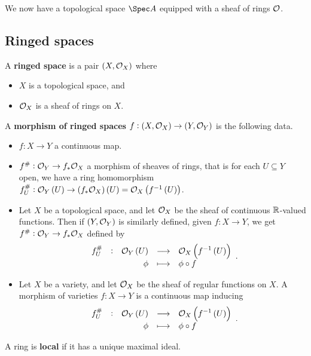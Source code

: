 We now have a topological space $ \Spec A $ equipped with a sheaf of rings $ \mathcal{O} $.

\subsection{Ringed spaces}

\begin{definition*}
A \textbf{ringed space} is a pair $ \br{X, \OOO_X} $ where
\begin{itemize}
\item $ X $ is a topological space, and
\item $ \mathcal{O}_X $ is a sheaf of rings on $ X $.
\end{itemize}
A \textbf{morphism of ringed spaces} $ f : \br{X, \OOO_X} \to \br{Y, \OOO_Y} $ is the following data.
\begin{itemize}
\item $ f : X \to Y $ a continuous map.
\item $ f^\# : \mathcal{O}_Y \to f_*\mathcal{O}_X $ a morphism of sheaves of rings, that is for each $ U \subseteq Y $ open, we have a ring homomorphism $ f_U^\# : \OOO_Y\br{U} \to \br{f_*\OOO_X}\br{U} = \OOO_X\br{f^{-1}\br{U}} $.
\end{itemize}
\end{definition*}

\pagebreak

\begin{example*}
\hfill
\begin{itemize}
\item Let $ X $ be a topological space, and let $ \mathcal{O}_X $ be the sheaf of continuous $ \mathbb{R} $-valued functions. Then if $ \br{Y, \OOO_Y} $ is similarly defined, given $ f : X \to Y $, we get $ f^\# : \mathcal{O}_Y \to f_*\mathcal{O}_X $ defined by
$$ \function[f_U^\#]{\OOO_Y\br{U}}{\OOO_X\br{f^{-1}\br{U}}}{\phi}{\phi \circ f}. $$
\item Let $ X $ be a variety, and let $ \mathcal{O}_X $ be the sheaf of regular functions on $ X $. A morphism of varieties $ f : X \to Y $ is a continuous map inducing
$$ \function[f_U^\#]{\OOO_Y\br{U}}{\OOO_X\br{f^{-1}\br{U}}}{\phi}{\phi \circ f}. $$
\end{itemize}
\end{example*}

A ring is \textbf{local} if it has a unique maximal ideal.

